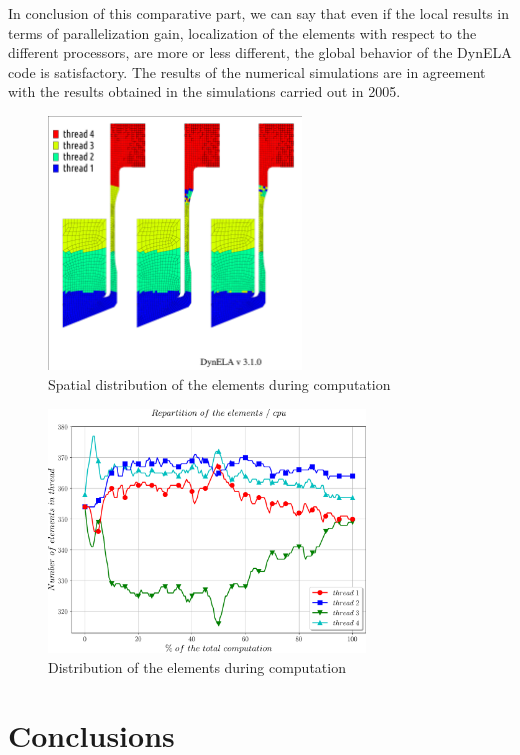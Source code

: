 \documentclass{article}
\begin{document}
In conclusion of this comparative part, we can say that even if the local results in terms of parallelization gain, localization of the elements with respect to the different processors, are more or less different, the global behavior of the DynELA code is satisfactory. The results of the numerical simulations are in agreement with the results obtained in the simulations carried out in 2005.

\begin{figure}[h!] 
  \centering
  \includegraphics[width=0.6\textwidth]{./spacethreads.pdf}
  \caption{Spatial distribution of the elements during computation}
  \label{spacethreads}
\end{figure}

\begin{figure}[h!] 
  \centering
  \includegraphics[width=0.75\textwidth]{./timethreads.pdf}
  \caption{Distribution of the elements during computation}
  \label{timethreads}
\end{figure}

\section {Conclusions}
\end{document}
